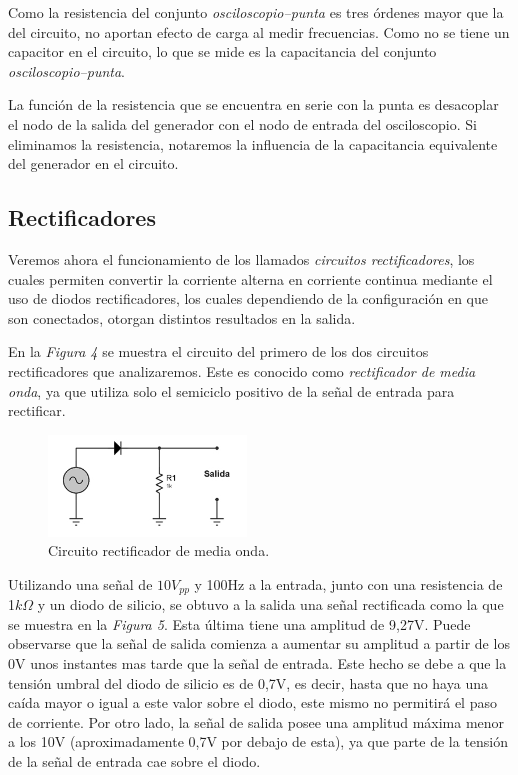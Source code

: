 \documentclass{article}
\begin{document}
	Como la resistencia del conjunto \textit{osciloscopio–punta} es tres órdenes mayor que la del circuito, no aportan efecto de carga al medir frecuencias. Como no se tiene un capacitor en el circuito, lo que se mide es la capacitancia del conjunto \textit{osciloscopio–punta}.
	\par
	La función de la resistencia que se encuentra en serie con la punta es desacoplar el nodo de la salida del generador con el nodo de entrada del osciloscopio. Si eliminamos la resistencia, notaremos la influencia de la capacitancia equivalente del generador en el circuito.
\bigskip\bigskip




\subsection{Rectificadores}
	
	Veremos ahora el funcionamiento de los llamados \textit{circuitos rectificadores}, los cuales permiten convertir la corriente alterna en corriente continua mediante el uso de diodos rectificadores, los cuales dependiendo de la configuración en que son conectados, otorgan distintos resultados en la salida. 
	\par
	En la \textit{Figura 4} se muestra el circuito del primero de los dos circuitos rectificadores que analizaremos. Este es conocido como \textit{rectificador de media onda}, ya que utiliza solo el semiciclo positivo de la señal de entrada para rectificar.
\bigskip


\begin{figure}[h]
	\centering
	\includegraphics[width=0.47\textwidth]{images/4-4-1-circuito-rectificador-media-onda.jpg}
	\medskip
	\caption{Circuito rectificador de media onda.}
\end{figure}


\newpage
	Utilizando una señal de $10V_{pp}$ y 100Hz a la entrada, junto con una resistencia de 1$k\Omega$ y un diodo de silicio, se obtuvo a la salida una señal rectificada como la que se muestra en la \textit{Figura 5}. Esta última tiene una amplitud de 9,27V. Puede observarse que la señal de salida comienza a aumentar su amplitud a partir de los 0V unos instantes mas tarde que la señal de entrada. Este hecho se debe a que la tensión umbral del diodo de silicio es de 0,7V, es decir, hasta que no haya una caída mayor o igual a este valor sobre el diodo, este mismo no permitirá el paso de corriente. Por otro lado, la señal de salida posee una amplitud máxima menor a los 10V (aproximadamente 0,7V por debajo de esta), ya que parte de la tensión de la señal de entrada cae sobre el diodo.
\bigskip\bigskip\bigskip
\end{document}
